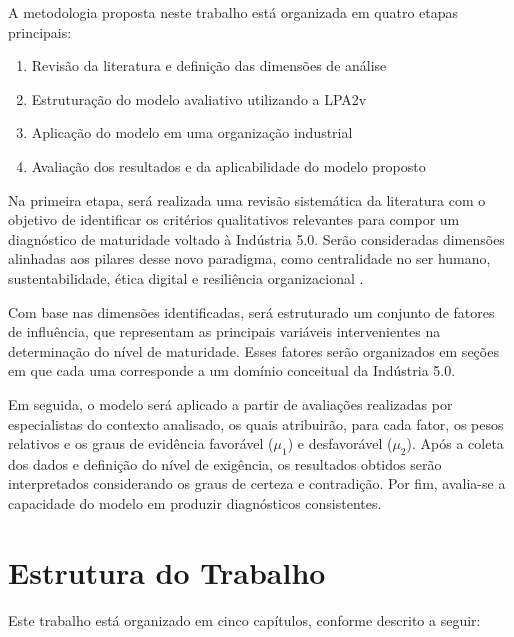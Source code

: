 A metodologia proposta neste trabalho está organizada em quatro etapas principais:
\begin{enumerate}[label=\roman*.]
    \item Revisão da literatura e definição das dimensões de análise
    \item Estruturação do modelo avaliativo utilizando a \gls{LPA2v}
    \item Aplicação do modelo em uma organização industrial
    \item Avaliação dos resultados e da aplicabilidade do modelo proposto
\end{enumerate}

Na primeira etapa, será realizada uma revisão sistemática da literatura com o objetivo de identificar os critérios qualitativos relevantes para compor um diagnóstico de maturidade voltado à Indústria 5.0.
Serão consideradas dimensões alinhadas aos pilares desse novo paradigma, como centralidade no ser humano, sustentabilidade, ética digital e resiliência organizacional \cite{euCommission2021}.

Com base nas dimensões identificadas, será estruturado um conjunto de fatores de influência, que representam as principais variáveis intervenientes na determinação do nível de maturidade.
Esses fatores serão organizados em seções em que cada uma corresponde a um domínio conceitual da Indústria 5.0. 

Em seguida, o modelo será aplicado a partir de avaliações realizadas por especialistas do contexto analisado, os quais atribuirão, para cada fator, os pesos relativos e os graus de evidência favorável ($\mu_1$) e desfavorável ($\mu_2$).
Após a coleta dos dados e definição do nível de exigência, os resultados obtidos serão interpretados considerando os graus de certeza e contradição. Por fim, avalia-se a capacidade do modelo em produzir diagnósticos consistentes.

\section{Estrutura do Trabalho}

Este trabalho está organizado em cinco capítulos, conforme descrito a seguir:

